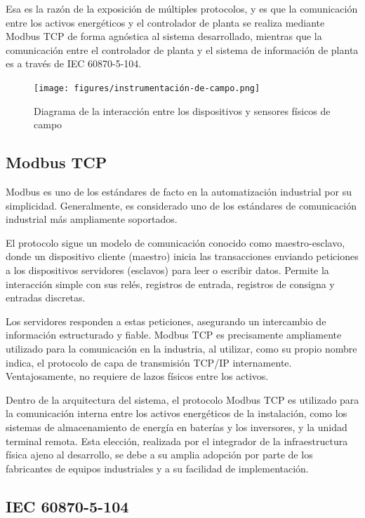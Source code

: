 Esa es la razón de la exposición de múltiples protocolos, y es que la comunicación entre los activos energéticos y el controlador de planta se realiza mediante Modbus TCP de forma agnóstica al sistema desarrollado, mientras que la comunicación entre el controlador de planta y el sistema de información de planta es a través de IEC 60870-5-104.

\begin{figure}
\centering
\texttt{[image: figures/instrumentación-de-campo.png]}
\caption{Diagrama de la interacción entre los dispositivos y sensores físicos de campo}
\label{fig:instrumentación-de-campo}
\end{figure}

\subsection{Modbus TCP}
\label{makereference3.3.1}

Modbus es uno de los estándares de facto en la automatización industrial por su simplicidad. Generalmente, es considerado uno de los estándares de comunicación industrial más ampliamente soportados.

El protocolo sigue un modelo de comunicación conocido como maestro-esclavo, donde un dispositivo cliente (maestro) inicia las transacciones enviando peticiones a los dispositivos servidores (esclavos) para leer o escribir datos. Permite la interacción simple con sus relés, registros de entrada, registros de consigna y entradas discretas.

Los servidores responden a estas peticiones, asegurando un intercambio de información estructurado y fiable. Modbus TCP es precisamente ampliamente utilizado para la comunicación en la industria, al utilizar, como su propio nombre indica, el protocolo de capa de transmisión TCP/IP internamente. Ventajosamente, no requiere de lazos físicos entre los activos.

Dentro de la arquitectura del sistema, el protocolo Modbus TCP es utilizado para la comunicación interna entre los activos energéticos de la instalación, como los sistemas de almacenamiento de energía en baterías y los inversores, y la unidad terminal remota. Esta elección, realizada por el integrador de la infraestructura física ajeno al desarrollo, se debe a su amplia adopción por parte de los fabricantes de equipos industriales y a su facilidad de implementación.

\subsection{IEC 60870-5-104}
\label{makereference3.3.2}

